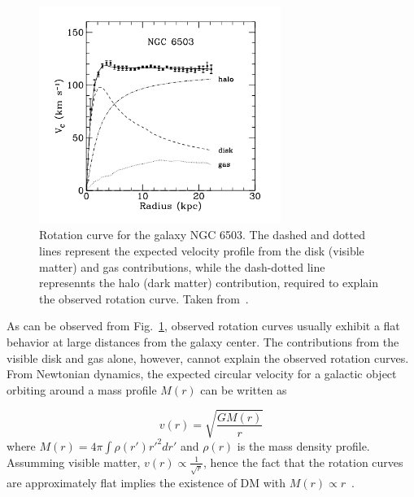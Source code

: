 \begin{figure}[htbp]
    \centering
    \includegraphics[width=0.7\textwidth]{galaxy_rot_curve.png}
    \caption{Rotation curve for the galaxy NGC 6503. The dashed and dotted lines represent the expected velocity profile
    from the disk (visible matter) and gas contributions, while the dash-dotted line represennts the halo (dark matter)
    contribution, required to explain the observed rotation curve. Taken from~\cite{Bertone:2004pz}.}
    \label{fig:galaxy_rot_curve}
\end{figure}

As can be observed from Fig.~\ref{fig:galaxy_rot_curve}, observed rotation curves usually exhibit a flat behavior at
large distances from the galaxy center. The contributions from the visible
disk and gas alone, however, cannot explain the observed rotation curves. 
From Newtonian dynamics, the expected circular velocity for a galactic object orbiting around a mass profile $M(r)$ 
can be written as

\begin{equation}
    v(r) = \sqrt{\frac{G M(r)}{r}}
\end{equation}
where $M(r) = 4\pi \int \rho(r') r'^{2} dr'$ and $\rho(r)$ is the mass density profile. Assumming visible matter, $v(r) \propto \frac{1}{\sqrt{r}}$,
hence the fact that the rotation curves are approximately flat implies the existence of DM with $M(r) \propto r$~\cite{Bertone:2004pz}.

